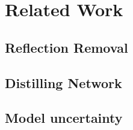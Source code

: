 \section{Related Work}

\subsection{Reflection Removal}

\subsection{Distilling Network}

\subsection{Model uncertainty}